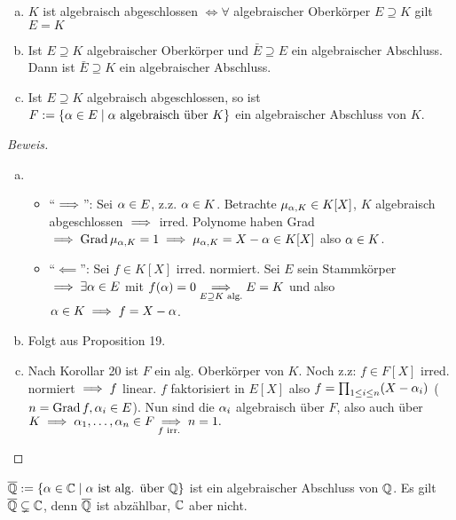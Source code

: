 \documentclass[a4paper]{report}
\begin{document}
\begin{prop}\item
\begin{enumerate}[(a)]
  \item $K$ ist algebraisch abgeschlossen $\iff \forall$ algebraischer Oberkörper $E \supseteq K$ gilt $E = K$
  \item Ist $E \supseteq K$ algebraischer Oberkörper und $\bar E \supseteq E$ ein algebraischer Abschluss. Dann ist $\bar E \supseteq K$ ein algebraischer Abschluss.
  \item Ist $E \supseteq K$ algebraisch abgeschlossen, so ist $F:= \{\alpha \in E \mid \alpha \text{ algebraisch über } K\}$ ein algebraischer Abschluss von $K$.
\end{enumerate}
\begin{proof}[Beweis]\item
\begin{enumerate}[(a)]
  \item
        \begin{itemize}
          \item ``$\implies$'': Sei $\alpha \in E$, z.z. $\alpha \in K$. Betrachte $\mu_{\alpha, K} \in K[X]$, $K$ algebraisch abgeschlossen $\implies$ irred. Polynome haben Grad $\implies \operatorname{Grad} \mu_{\alpha, K} = 1 \implies \mu_{\alpha, K} = X - \alpha \in K[X]$ also $\alpha \in K$.
          \item ``$\impliedby$'': Sei $f \in K[X]$ irred. normiert. Sei $E$ sein Stammkörper $\implies \exists \alpha \in E$ mit $f(\alpha)  = 0 \underset{E \supseteq K \text{ alg.}} {\implies} E = K$ und also $\alpha \in K \implies f = X - \alpha$.
        \end{itemize}
  \item Folgt aus Proposition 19.
  \item Nach Korollar 20 ist $F$ ein alg. Oberkörper von $K$.
        Noch z.z: $f \in F[X]$ irred. normiert $\implies f$ linear. $f$ faktorisiert in $E[X]$ also $f = \prod_{1 \le i \le n} (X - \alpha_{i})$ ($n = \operatorname{Grad} f, \alpha_{i} \in E$). Nun sind die $\alpha_{i}$ algebraisch über $F$, also auch über $K \implies \alpha_{1}, \ldots, \alpha_{n} \in F \underset{f \text{ irr. }} {\implies} n = 1.$ \qedhere
\end{enumerate}
\end{proof}
\end{prop}
\begin{bsp}
  $\overline {\mathbb{Q}}:= \{\alpha \in \mathbb{C} \mid \alpha \text{ ist alg. über } \mathbb{Q}\}$ ist ein algebraischer Abschluss von $\mathbb{Q}$. Es gilt $\overline {\mathbb{Q}} \subsetneq \mathbb{C}$, denn $\overline {\mathbb{Q}}$ ist abzählbar, $\mathbb{C}$ aber nicht.
\end{bsp}
\end{document}
